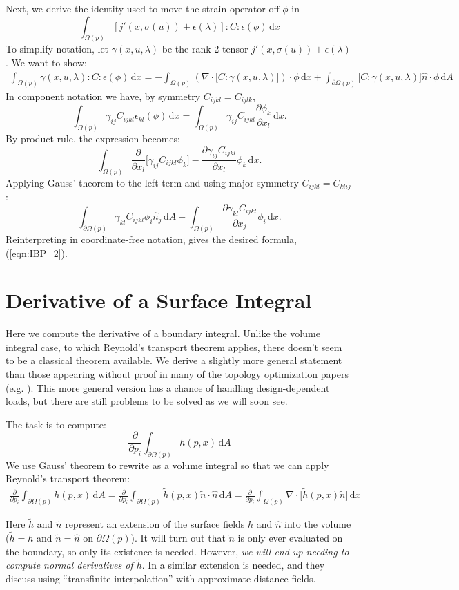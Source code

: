 \documentclass[10pt]{article}
\renewcommand{\div}{\nabla \cdot}
\providecommand{\shape}{\Omega(p)}
\providecommand{\boundary}{\partial \shape}
\providecommand{\vint}[1]{\int_{\shape} \! #1 \, \mathrm{d}x}
\providecommand{\sint}[1]{\int_{\boundary} \! #1 \, \mathrm{d}A}
\providecommand{\pder}[2]{\frac{\partial #1}{\partial #2}}
\begin{document}
\begin{appendices}
    Next, we derive the identity used to move the strain operator off $\phi$ in
    $$
    \vint{\left[j'(x, \sigma(u)) + \epsilon(\lambda)\right] : C : \epsilon(\phi)}
    $$
    To simplify notation, let $\gamma(x, u, \lambda)$ be the rank 2 tensor
    $j'(x, \sigma(u)) + \epsilon(\lambda)$. We want to show:
    \begin{align}
    \vint{\gamma(x, u, \lambda) : C : \epsilon(\phi)} =
    -\vint{\left(\div \big[C : \gamma(x, u, \lambda)\big]\right) \cdot \phi}
    + \sint{\big[C : \gamma(x, u, \lambda) \big] \hat{n} \cdot \phi}
    \label{eqn:IBP_2}
    \end{align}
    In component notation we have, by symmetry $C_{ijkl} = C_{ijlk}$,
    $$
    \vint{\gamma_{ij} C_{ijkl} \epsilon_{kl}(\phi)} = \vint{\gamma_{ij} C_{ijkl} \pder{\phi_k}{x_l}}.
    $$
    By product rule, the expression becomes:
    $$
    \vint{\pder{}{x_l}\big[\gamma_{ij} C_{ijkl} \phi_k \big] - \pder{\gamma_{ij} C_{ijkl}}{x_l} \phi_k}.
    $$
    Applying Gauss' theorem to the left term and using major symmetry $C_{ijkl} = C_{klij}$:
    $$
    \sint{\gamma_{kl} C_{ijkl} \phi_i \hat{n}_j} - \vint{\pder{\gamma_{kl}C_{ijkl} }{x_j} \phi_i}.
    $$
    Reinterpreting in coordinate-free notation, gives the desired formula, (\ref{eqn:IBP_2}).
    \section{Derivative of a Surface Integral}
    \label{sec:der_sint}
    Here we compute the derivative of a boundary integral. Unlike the volume
    integral case, to which Reynold's transport theorem applies, there doesn't
    seem to be a classical theorem available. We derive a slightly more general
    statement than those appearing without proof in many of the topology
    optimization papers (e.g. \cite{Allaire2008909}). This more general version
    has a chance of handling design-dependent loads, but there are still
    problems to be solved as we will soon see.

    The task is to compute:
    $$
    \pder{}{p_i} \sint{h(p, x)}
    $$
    We use Gauss' theorem to rewrite as a volume integral so that we can apply
    Reynold's transport theorem:
    \begin{align*}
        \pder{}{p_i} \sint{h(p, x)} = \pder{}{p_i} \sint{\tilde{h}(p, x)\tilde{n} \cdot \hat{n}}
    = \pder{}{p_i} \vint{\div \big[\tilde{h}(p, x)\tilde{n} \big]}
    \end{align*}

    Here $\tilde{h}$ and $\tilde{n}$ represent an extension of the surface
    fields $h$ and $\hat{n}$ into the volume ($\tilde{h} = h$ and $\tilde{n} =
    \hat{n}$ on $\boundary$). It will turn out that $\tilde{n}$
    is only ever evaluated on the boundary, so only its existence is needed.
    However, {\it we will end up needing to compute normal derivatives of
    $\tilde{h}$}. In \cite{chen2007shape} a similar extension is needed, and
    they discuss using ``transfinite interpolation'' with approximate distance
    fields.
    

\end{appendices}
\end{document}

